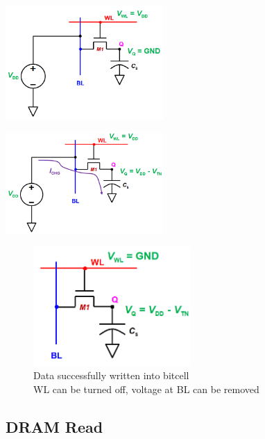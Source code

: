 \documentclass{article}
\begin{document}
\begin{minipage}[t]{0.5\textwidth}
    \centering
    \includegraphics[width=6cm, scale=1]{dramWrite_3.PNG}
    \captionsetup{justification=centering}
\end{minipage}%
\begin{minipage}[t]{0.5\textwidth}
    \centering
    \includegraphics[width=6cm, scale=1]{dramWrite_4.PNG}
    \captionsetup{justification=centering}
\end{minipage}%

\begin{figure}[htp]
    \centering
    \includegraphics[width=6cm, scale=1]{dramWrite_5.PNG}
    \caption{Data successfully written into bitcell\\
                WL can be turned off, voltage at BL can be removed}
\end{figure}

\newpage
\subsection{DRAM Read}
\end{document}

